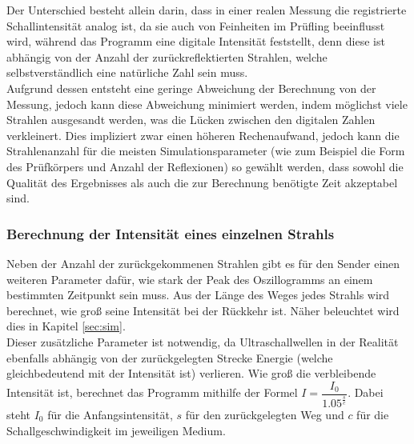 \documentclass[reducespace,stylepage,semiarbeit]{spezidoc}
\begin{document}
Der Unterschied besteht allein darin, dass in einer realen Messung die registrierte Schallintensität analog ist, da sie auch von Feinheiten im Prüfling beeinflusst wird, während das Programm eine digitale Intensität feststellt, denn diese ist abhängig von der Anzahl der zurückreflektierten Strahlen, welche selbstverständlich eine natürliche Zahl sein muss.\\
Aufgrund dessen entsteht eine geringe Abweichung der Berechnung von der Messung, jedoch kann diese Abweichung minimiert werden, indem möglichst viele Strahlen ausgesandt werden, was die \glqq Lücken\grqq{} zwischen den digitalen Zahlen verkleinert. 
Dies impliziert zwar einen höheren Rechenaufwand, jedoch kann die Strahlenanzahl für die meisten Simulationsparameter (wie zum Beispiel die Form des Prüfkörpers und Anzahl der Reflexionen) so gewählt werden, dass sowohl die Qualität des Ergebnisses als auch die zur Berechnung benötigte Zeit akzeptabel sind.

\subsubsection{Berechnung der Intensität eines einzelnen Strahls}
Neben der Anzahl der zurückgekommenen Strahlen gibt es für den Sender einen weiteren Parameter dafür, wie stark der Peak des Oszillogramms an einem bestimmten Zeitpunkt sein muss. 
Aus der Länge des Weges jedes Strahls wird berechnet, wie groß seine Intensität bei der Rückkehr ist. 
Näher beleuchtet wird dies in Kapitel \ref{sec:sim}.\\
Dieser zusätzliche Parameter ist notwendig, da Ultraschallwellen in der Realität ebenfalls abhängig von der zurückgelegten Strecke Energie (welche gleichbedeutend mit der Intensität ist) verlieren. 
Wie groß die verbleibende Intensität ist, berechnet das Programm mithilfe der Formel $I = \dfrac{I_0}{1.05^{\tfrac{s}{c}}}$. 
Dabei steht $I_0$ für die Anfangsintensität, $s$ für den zurückgelegten Weg und $c$ für die Schallgeschwindigkeit im jeweiligen Medium.
\end{document}
